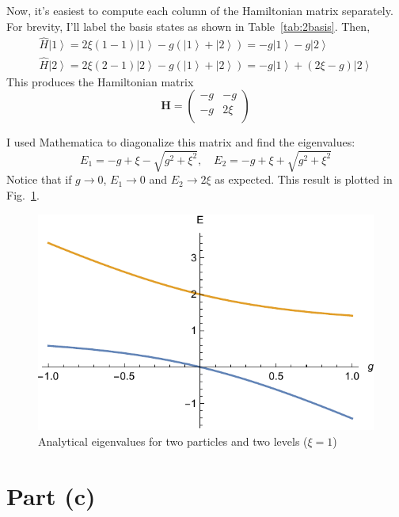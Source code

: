 \documentclass{article}
\newcommand{\ket}[1]{\ensuremath{\left| #1 \right>}}
\begin{document}
	Now, it's easiest to compute each column of the Hamiltonian matrix separately. For brevity, I'll label the basis states as shown in Table~\ref{tab:2basis}. Then,
	\begin{gather*}
		\hat H \ket{1} = 2\xi(1-1) \ket{1} - g \left( \ket{1} + \ket{2} \right) = -g \ket{1} - g \ket{2} \\
		\hat H \ket{2} = 2\xi(2-1) \ket{2} - g \left(\ket{1} + \ket{2}\right) = -g \ket{1} + (2\xi-g) \ket{2}
	\end{gather*}
	This produces the Hamiltonian matrix
	\begin{equation}
		\mathbf{H} = \begin{pmatrix}
			-g & -g \\
			-g & 2\xi \\
		\end{pmatrix}
	\end{equation}

	I used Mathematica to diagonalize this matrix and find the eigenvalues:
	\begin{equation}
		E_1 = -g + \xi - \sqrt{g^2 + \xi^2}, \quad E_2 = -g + \xi + \sqrt{g^2 + \xi^2}
	\end{equation}
	Notice that if $g \rightarrow 0$, $E_1 \rightarrow 0$ and $E_2 \rightarrow 2\xi$ as expected. This result is plotted in Fig.~\ref{fig:2lev_analytical}.

	\begin{figure}[p]
		\centering
		\includegraphics{sol2.pdf}
		\caption{Analytical eigenvalues for two particles and two levels ($\xi=1$)}
		\label{fig:2lev_analytical}
	\end{figure}

\section*{Part (c)}
\end{document}
